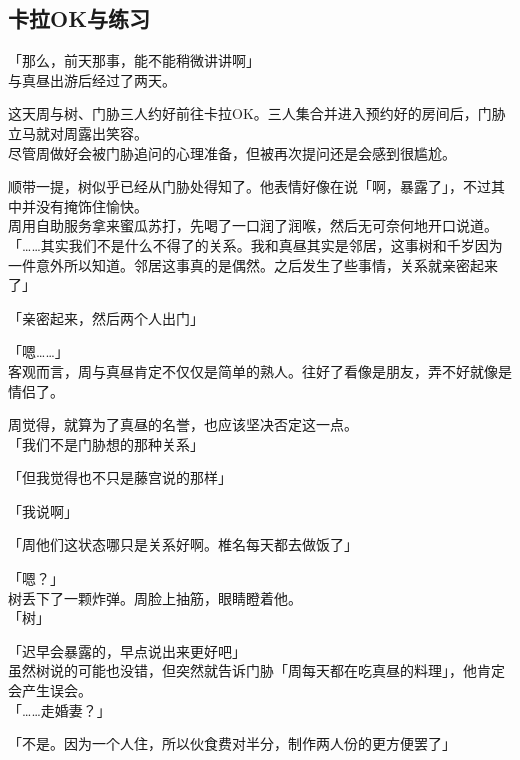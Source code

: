 \subsection{卡拉OK与练习}

「那么，前天那事，能不能稍微讲讲啊」\\

与真昼出游后经过了两天。

这天周与树、门胁三人约好前往卡拉OK。三人集合并进入预约好的房间后，门胁立马就对周露出笑容。\\

尽管周做好会被门胁追问的心理准备，但被再次提问还是会感到很尴尬。

顺带一提，树似乎已经从门胁处得知了。他表情好像在说「啊，暴露了」，不过其中并没有掩饰住愉快。\\

周用自助服务拿来蜜瓜苏打，先喝了一口润了润喉，然后无可奈何地开口说道。\\

「……其实我们不是什么不得了的关系。我和真昼其实是邻居，这事树和千岁因为一件意外所以知道。邻居这事真的是偶然。之后发生了些事情，关系就亲密起来了」

「亲密起来，然后两个人出门」

「嗯……」\\

客观而言，周与真昼肯定不仅仅是简单的熟人。往好了看像是朋友，弄不好就像是情侣了。

周觉得，就算为了真昼的名誉，也应该坚决否定这一点。\\

「我们不是门胁想的那种关系」

「但我觉得也不只是藤宫说的那样」

「我说啊」

「周他们这状态哪只是关系好啊。椎名每天都去做饭了」

「嗯？」\\

树丢下了一颗炸弹。周脸上抽筋，眼睛瞪着他。\\

「树」

「迟早会暴露的，早点说出来更好吧」\\

虽然树说的可能也没错，但突然就告诉门胁「周每天都在吃真昼的料理」，他肯定会产生误会。\\

「……走婚妻？」

「不是。因为一个人住，所以伙食费对半分，制作两人份的更方便罢了」

